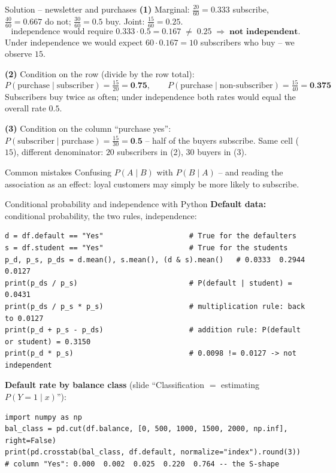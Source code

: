\documentclass[aspectratio=169,11pt]{beamer}
\begin{document}
\begin{frame}{Solution -- newsletter and purchases}
  \textbf{(1)} Marginal: $\frac{20}{60}=0.333$ subscribe,
  $\frac{40}{60}=0.667$ do not; $\frac{30}{60}=0.5$ buy.
  Joint: $\frac{15}{60}=0.25$.
  \[
    \text{independence would require } 0.333\cdot0.5=0.167
    \;\neq\; 0.25
    \;\Rightarrow\;\textbf{not independent}.
  \]
  Under independence we would expect $60\cdot0.167=10$ subscribers who buy
  -- we observe $15$.

  \medskip
  \textbf{(2)} Condition on the row (divide by the row total):
  \[
    P(\text{purchase}\mid\text{subscriber})=\tfrac{15}{20}=\textbf{0.75},
    \qquad
    P(\text{purchase}\mid\text{non-subscriber})=\tfrac{15}{40}=\textbf{0.375}
  \]
  Subscribers buy twice as often; under independence both rates would equal
  the overall rate $0.5$.

  \medskip
  \textbf{(3)} Condition on the column ``purchase yes'':
  $P(\text{subscriber}\mid\text{purchase})=\frac{15}{30}=\textbf{0.5}$ -- half
  of the buyers subscribe. Same cell ($15$), different denominator: $20$
  subscribers in (2), $30$ buyers in (3).
  \begin{alertblock}{Common mistakes}
    Confusing $P(A\mid B)$ with $P(B\mid A)$ -- and reading the association
    as an effect: loyal customers may simply be more likely to subscribe.
  \end{alertblock}
\end{frame}

\begin{frame}[fragile]{Conditional probability and independence with Python}
  \textbf{Default data:} conditional probability, the two rules,
  independence:
\begin{lstlisting}
d = df.default == "Yes"                    # True for the defaulters
s = df.student == "Yes"                    # True for the students
p_d, p_s, p_ds = d.mean(), s.mean(), (d & s).mean()   # 0.0333  0.2944  0.0127
print(p_ds / p_s)                          # P(default | student) = 0.0431
print(p_ds / p_s * p_s)                    # multiplication rule: back to 0.0127
print(p_d + p_s - p_ds)                    # addition rule: P(default or student) = 0.3150
print(p_d * p_s)                           # 0.0098 != 0.0127 -> not independent
\end{lstlisting}
  \textbf{Default rate by balance class} (slide ``Classification $=$
  estimating $P(Y=1\mid x)$''):
\begin{lstlisting}
import numpy as np
bal_class = pd.cut(df.balance, [0, 500, 1000, 1500, 2000, np.inf], right=False)
print(pd.crosstab(bal_class, df.default, normalize="index").round(3))
# column "Yes": 0.000  0.002  0.025  0.220  0.764 -- the S-shape
\end{lstlisting}
\end{frame}
\end{document}
